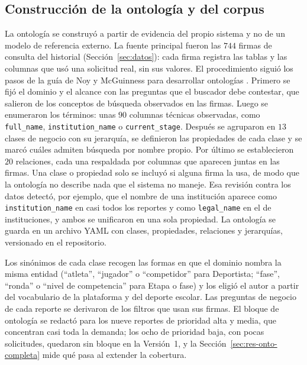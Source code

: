 \documentclass[11pt,letterpaper]{article}
\numberwithin{equation}{section}
\begin{document}
\subsection{Construcción de la ontología y del corpus}
\label{sec:construccion-ontologia}
La ontología se construyó a partir de evidencia del propio sistema y no de un modelo de referencia externo. La fuente principal fueron las $744$ firmas de consulta del historial (Sección~\ref{sec:datos}): cada firma registra las tablas y las columnas que usó una solicitud real, sin sus valores. El procedimiento siguió los pasos de la guía de Noy y McGuinness para desarrollar ontologías \cite{noy2001ontology}. Primero se fijó el dominio y el alcance con las preguntas que el buscador debe contestar, que salieron de los conceptos de búsqueda observados en las firmas. Luego se enumeraron los términos: unas $90$ columnas técnicas observadas, como \texttt{full\_name}, \texttt{institution\_name} o \texttt{current\_stage}. Después se agruparon en $13$ clases de negocio con su jerarquía, se definieron las propiedades de cada clase y se marcó cuáles admiten búsqueda por nombre propio. Por último se establecieron $20$ relaciones, cada una respaldada por columnas que aparecen juntas en las firmas. Una clase o propiedad solo se incluyó si alguna firma la usa, de modo que la ontología no describe nada que el sistema no maneje. Esa revisión contra los datos detectó, por ejemplo, que el nombre de una institución aparece como \texttt{institution\_name} en casi todos los reportes y como \texttt{legal\_name} en el de instituciones, y ambos se unificaron en una sola propiedad. La ontología se guarda en un archivo YAML con clases, propiedades, relaciones y jerarquías, versionado en el repositorio.

Los sinónimos de cada clase recogen las formas en que el dominio nombra la misma entidad (``atleta'', ``jugador'' o ``competidor'' para Deportista; ``fase'', ``ronda'' o ``nivel de competencia'' para Etapa o fase) y los eligió el autor a partir del vocabulario de la plataforma y del deporte escolar. Las preguntas de negocio de cada reporte se derivaron de los filtros que usan sus firmas. El bloque de ontología se redactó para los nueve reportes de prioridad alta y media, que concentran casi toda la demanda; los ocho de prioridad baja, con pocas solicitudes, quedaron sin bloque en la Versión~1, y la Sección~\ref{sec:res-onto-completa} mide qué pasa al extender la cobertura.
\end{document}

